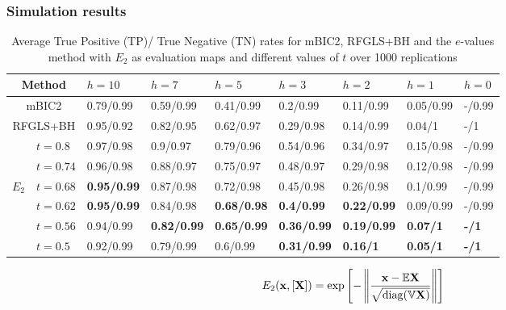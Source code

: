 \documentclass[handout,10pt]{beamer}
\DeclareMathOperator*{\diag}{diag}
\begin{document}
\begin{frame}
\frametitle{Simulation results}

\begin{table}
\centering
\begin{scriptsize}
    \begin{tabular}{c|l|lllllll}
    \hline
    \multicolumn{2}{c|}{Method}          & $h = 10$    & $h = 7$     & $h = 5$     & $h = 3$     & $h = 2$     & $h = 1$     & $h = 0$     \\ \hline
    \multicolumn{2}{c|}{mBIC2}           & 0.79/0.99 & 0.59/0.99 & 0.41/0.99 & 0.2/0.99  & 0.11/0.99 & 0.05/0.99 & -/0.99 \\
    \multicolumn{2}{c|}{RFGLS+BH}        & 0.95/0.92 & 0.82/0.95 & 0.62/0.97 & 0.29/0.98 & 0.14/0.99 & 0.04/1    & -/1       \\ \hline
    ~        & $t = 0.8$    & 0.97/0.98 & 0.9/0.97  & 0.79/0.96 & 0.54/0.96 & 0.34/0.97 & 0.15/0.98 & -/0.99 \\
    ~        & $t = 0.74$   & 0.96/0.98 & 0.88/0.97 & 0.75/0.97 & 0.48/0.97 & 0.29/0.98 & 0.12/0.98 & -/0.99 \\
    $E_2$    & $t = 0.68$   & \textbf{0.95/0.99} & 0.87/0.98 & 0.72/0.98 & 0.45/0.98 & 0.26/0.98 & 0.1/0.99  & -/0.99 \\
    ~        & $t = 0.62$   & \textbf{0.95/0.99} & 0.84/0.98 & \textbf{0.68/0.98} & \textbf{0.4/0.99}  & \textbf{0.22/0.99} & 0.09/0.99 & -/0.99    \\
    ~        & $t = 0.56$   & 0.94/0.99 & \textbf{0.82/0.99} & \textbf{0.65/0.99} & \textbf{0.36/0.99} & \textbf{0.19/0.99} & \textbf{0.07/1}    & \textbf{-/1  }     \\
    ~        & $t = 0.5$    & 0.92/0.99 & 0.79/0.99 & 0.6/0.99  & \textbf{0.31/0.99} & \textbf{0.16/1}    & \textbf{0.05/1}    & \textbf{-/1  }     \\ \hline
\end{tabular}
\end{scriptsize}
\caption{Average True Positive (TP)/ True Negative (TN) rates for mBIC2, RFGLS+BH and the $e$-values method with $E_2$ as evaluation maps and different values of $t$ over 1000 replications}
\end{table}

$$
E_2 (\bfx, [ \bfX]) = \exp \left[ - \left\| \frac{\bfx - \BE \bfX }{ \sqrt { \diag  (\BV \bfX) }}  \right\| \right]
$$
\end{frame}
\end{document}
